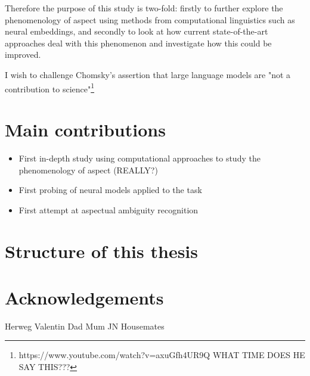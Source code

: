 Therefore the purpose of this study is two-fold: firstly to further explore the phenomenology of aspect using methods from computational linguistics such as neural embeddings, and secondly to look at how current state-of-the-art approaches deal with this phenomenon and investigate how this could be improved.


I wish to challenge Chomsky's assertion that large language models are "not a contribution to science"\footnote{https://www.youtube.com/watch?v=axuGfh4UR9Q WHAT TIME DOES HE SAY THIS???}

\section*{Main contributions}
\begin{itemize}
    \item First in-depth study using computational approaches to study the phenomenology of aspect (REALLY?)
    \item First probing of neural models applied to the task
    \item First attempt at aspectual ambiguity recognition
\end{itemize}
\section*{Structure of this thesis}

\section*{Acknowledgements}
Herweg
Valentin
Dad
Mum
JN
Housemates